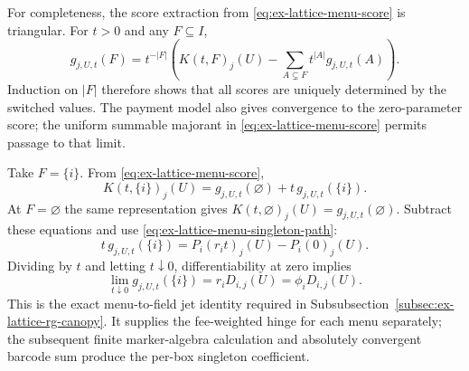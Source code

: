 For completeness, the score extraction from \eqref{eq:ex-lattice-menu-score}
is triangular. For $t>0$ and any $F\subseteq I$,
\[
 g_{j,U,t}(F)=t^{-|F|}\left(K(t,F)_j(U)
       -\sum_{A\subsetneq F}t^{|A|}g_{j,U,t}(A)\right).
\]
Induction on $|F|$ therefore shows that all scores are uniquely determined
by the switched values. The payment model also gives convergence to the
zero-parameter score; the uniform summable majorant in
\eqref{eq:ex-lattice-menu-score} permits passage to that limit.

Take $F=\{i\}$. From \eqref{eq:ex-lattice-menu-score},
\[
 K(t,\{i\})_j(U)=g_{j,U,t}(\varnothing)
                      +t\,g_{j,U,t}(\{i\}).
\]
At $F=\varnothing$ the same representation gives
$K(t,\varnothing)_j(U)=g_{j,U,t}(\varnothing)$. Subtract these equations
and use \eqref{eq:ex-lattice-menu-singleton-path}:
\[
 t\,g_{j,U,t}(\{i\})=P_i(r_i t)_j(U)-P_i(0)_j(U).
\]
Dividing by $t$ and letting $t\downarrow0$, differentiability at zero
implies
\begin{equation}
 \lim_{t\downarrow0}g_{j,U,t}(\{i\})=r_iD_{i,j}(U)
       =\phi_iD_{i,j}(U).
 \label{eq:ex-lattice-menu-jet-proof}
\end{equation}
This is the exact menu-to-field jet identity required in
Subsubsection~\ref{subsec:ex-lattice-rg-canopy}. It supplies the fee-weighted
hinge for each menu separately; the subsequent finite marker-algebra
calculation and absolutely convergent barcode sum produce the per-box
singleton coefficient.
